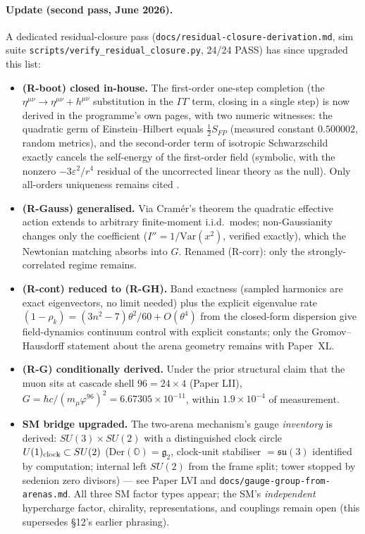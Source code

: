\documentclass[12pt]{article}
\theoremstyle{definition}
\theoremstyle{remark}
\begin{document}
\paragraph{Update (second pass, June 2026).} A dedicated residual-closure pass (\texttt{docs/residual-closure-derivation.md}, sim suite \texttt{scripts/verify\_residual\_closure.py}, 24/24 PASS) has since upgraded this list:
\begin{itemize}
\item \textbf{(R-boot) closed in-house.} The first-order one-step completion (the $\eta^{\mu\nu} \to \eta^{\mu\nu} + h^{\mu\nu}$ substitution in the $\Gamma\Gamma$ term, closing in a single step) is now derived in the programme's own pages, with two numeric witnesses: the quadratic germ of Einstein--Hilbert equals $\tfrac12 S_{FP}$ (measured constant $0.500002$, random metrics), and the second-order term of isotropic Schwarzschild exactly cancels the self-energy of the first-order field (symbolic, with the nonzero $-3\varepsilon^2/r^4$ residual of the uncorrected linear theory as the null). Only all-orders uniqueness remains cited \citep{Wald1986}.
\item \textbf{(R-Gauss) generalised.} Via Cram\'er's theorem the quadratic effective action extends to arbitrary finite-moment i.i.d.\ modes; non-Gaussianity changes only the coefficient ($I'' = 1/\mathrm{Var}(x^2)$, verified exactly), which the Newtonian matching absorbs into $G$. Renamed (R-corr): only the strongly-correlated regime remains.
\item \textbf{(R-cont) reduced to (R-GH).} Band exactness (sampled harmonics are exact eigenvectors, no limit needed) plus the explicit eigenvalue rate $(1-\rho_k) = (3n^2{-}7)\theta^2/60 + O(\theta^4)$ from the closed-form dispersion give field-dynamics continuum control with explicit constants; only the Gromov--Hausdorff statement about the arena geometry remains with Paper~XL.
\item \textbf{(R-G) conditionally derived.} Under the prior structural claim that the muon sits at cascade shell $96 = 24\times4$ (Paper LII), $G = \hbar c/(m_\mu\varphi^{96})^2 = 6.67305\times10^{-11}$, within $1.9\times10^{-4}$ of measurement.
\item \textbf{SM bridge upgraded.} The two-arena mechanism's gauge \emph{inventory} is derived: $SU(3)\times SU(2)$ with a distinguished clock circle $U(1)_{\rm clock} \subset SU(2)$ ($\mathrm{Der}(\mathbb O) = \mathfrak g_2$, clock-unit stabiliser $= \mathfrak{su}(3)$ identified by computation; internal left $SU(2)$ from the frame split; tower stopped by sedenion zero divisors) --- see Paper LVI and \texttt{docs/gauge-group-from-arenas.md}. All three SM factor types appear; the SM's \emph{independent} hypercharge factor, chirality, representations, and couplings remain open (this supersedes \S12's earlier phrasing).
\end{itemize}
\end{document}
